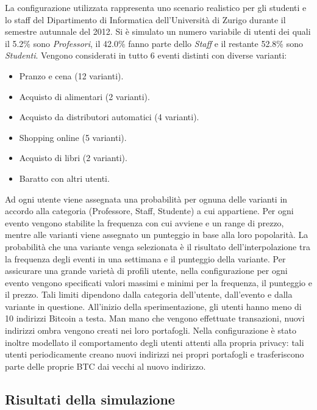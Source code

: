 La configurazione utilizzata rappresenta uno scenario realistico per gli studenti e lo staff del Dipartimento di Informatica dell'Università di Zurigo durante il semestre autunnale del 2012.
Si è simulato un numero variabile di utenti dei quali il 5.2\% sono \emph{Professori}, il 42.0\% fanno parte dello \emph{Staff} e il restante 52.8\% sono \emph{Studenti}. Vengono considerati in tutto 6 eventi distinti con diverse varianti:
\begin{itemize}
    \item Pranzo e cena (12 varianti).
    \item Acquisto di alimentari (2 varianti).
    \item Acquisto da distributori automatici (4 varianti).
    \item Shopping online (5 varianti).
    \item Acquisto di libri (2 varianti).
    \item Baratto con altri utenti.
\end{itemize}
Ad ogni utente viene assegnata una probabilità per ognuna delle varianti in accordo alla categoria (Professore, Staff, Studente) a cui appartiene.
Per ogni evento vengono stabilite la frequenza con cui avviene e un range di prezzo, mentre alle varianti viene assegnato un punteggio in base alla loro popolarità. La probabilità che una variante venga selezionata è il risultato dell'interpolazione tra la frequenza degli eventi in una settimana e il punteggio della variante.
Per assicurare una grande varietà di profili utente, nella configurazione per ogni evento vengono specificati valori massimi e minimi per la frequenza, il punteggio e il prezzo. Tali limiti dipendono dalla categoria dell'utente, dall'evento e dalla variante in questione.
All'inizio della sperimentazione, gli utenti hanno meno di 10 indirizzi Bitcoin a testa. Man mano che vengono effettuate transazioni, nuovi indirizzi ombra vengono creati nei loro portafogli.
Nella configurazione è stato inoltre modellato il comportamento degli utenti attenti alla propria privacy: tali utenti periodicamente creano nuovi indirizzi nei propri portafogli e trasferiscono parte delle proprie BTC dai vecchi al nuovo indirizzo.

\subsection{Risultati della simulazione}\label{risultati-simulazione}

